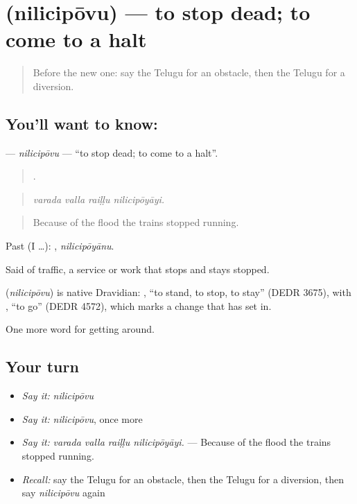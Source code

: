 \section[\texorpdfstring{\te{నిలిచిపోవు} (nilicipōvu)}{నిలిచిపోవు (nilicipōvu)}]{ (nilicipōvu) — to stop dead; to come to a halt}

\label{lesson:TE-C449-nilicipovu}



\begin{quote}
Before the new one: say the Telugu for an obstacle, then the Telugu for a diversion.
\end{quote}

\subsection*{You'll want to know: }
\textbf{} — \emph{nilicipōvu} — \textquotedblleft{}to stop dead; to come to a halt\textquotedblright{}.

\begin{quote}
   .
\end{quote}

\begin{quote}
\emph{varada valla raiḷḷu nilicipōyāyi.}
\end{quote}

\begin{quote}
Because of the flood the trains stopped running.
\end{quote}

Past (I …): , \emph{nilicipōyānu}.

Said of traffic, a service or work that stops and stays stopped.

\begin{cousinweb}
\textbf{} (\emph{nilicipōvu}) is native Dravidian: , \textquotedblleft{}to stand, to stop, to stay\textquotedblright{} (DEDR 3675), with , \textquotedblleft{}to go\textquotedblright{} (DEDR 4572), which marks a change that has set in.
\end{cousinweb}

\begin{grammarlens}[title={What you've built}]
One more word for getting around.
\end{grammarlens}

\subsection*{Your turn}
\begin{itemize}
\raggedright
  \item \emph{Say it:} \emph{nilicipōvu}
  \item \emph{Say it:} \emph{nilicipōvu}, once more
  \item \emph{Say it:} \emph{varada valla raiḷḷu nilicipōyāyi.} — Because of the flood the trains stopped running.
  \item \emph{Recall:} say the Telugu for an obstacle, then the Telugu for a diversion, then say \emph{nilicipōvu} again
\end{itemize}

